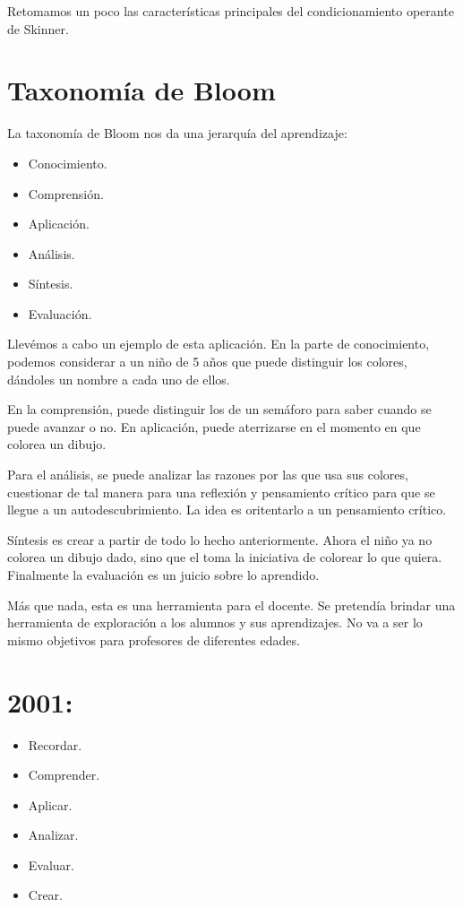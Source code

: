 \documentclass[12pt]{report}
\theoremstyle{largebreak}
\begin{document}
    Retomamos un poco las características principales del condicionamiento operante de Skinner.

    \section{Taxonomía de Bloom}

    La taxonomía de Bloom nos da una jerarquía del aprendizaje:
    \begin{itemize}
        \item Conocimiento.
        \item Comprensión.
        \item Aplicación.
        \item Análisis.
        \item Síntesis.
        \item Evaluación.
    \end{itemize}

    Llevémos a cabo un ejemplo de esta aplicación. En la parte de conocimiento, podemos considerar a un niño de 5 años que puede distinguir los colores, dándoles un nombre a cada uno de ellos.

    En la comprensión, puede distinguir los de un semáforo para saber cuando se puede avanzar o no. En aplicación, puede aterrizarse en el momento en que colorea un dibujo.

    Para el análisis, se puede analizar las razones por las que usa sus colores, cuestionar de tal manera para una reflexión y pensamiento crítico para que se llegue a un autodescubrimiento. La idea es oritentarlo a un pensamiento crítico.

    Síntesis es crear a partir de todo lo hecho anteriormente. Ahora el niño ya no colorea un dibujo dado, sino que el toma la iniciativa de colorear lo que quiera. Finalmente la evaluación es un juicio sobre lo aprendido.

    Más que nada, esta es una herramienta para el docente. Se pretendía brindar una herramienta de exploración a los alumnos y sus aprendizajes. No va a ser lo mismo objetivos para profesores de diferentes edades.

    \section*{2001:}

    \begin{itemize}
        \item Recordar.
        \item Comprender.
        \item Aplicar.
        \item Analizar.
        \item Evaluar.
        \item Crear.
    \end{itemize}
\end{document}
